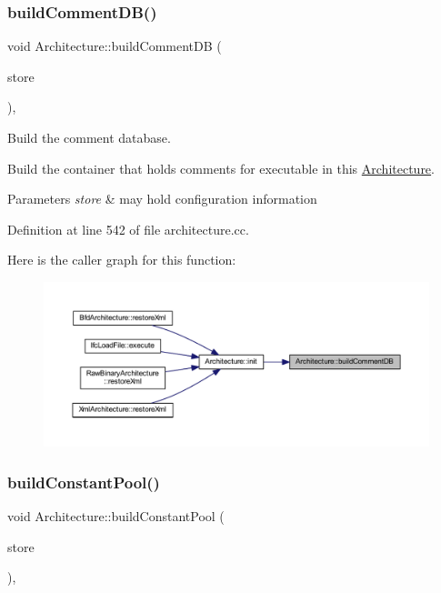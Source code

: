 \subsubsection{\texorpdfstring{buildCommentDB()}{buildCommentDB()}}
{\footnotesize\ttfamily void Architecture\+::build\+Comment\+DB (\begin{DoxyParamCaption}\item[{\mbox{\hyperlink{class_document_storage}{Document\+Storage}} \&}]{store }\end{DoxyParamCaption})\hspace{0.3cm}{\ttfamily [protected]}, {\ttfamily [virtual]}}



Build the comment database. 

Build the container that holds comments for executable in this \mbox{\hyperlink{class_architecture}{Architecture}}. 
\begin{DoxyParams}{Parameters}
{\em store} & may hold configuration information \\
\hline
\end{DoxyParams}


Definition at line 542 of file architecture.\+cc.

Here is the caller graph for this function\+:
\nopagebreak
\begin{figure}[H]
\begin{center}
\leavevmode
\includegraphics[width=350pt]{class_architecture_a517bf0e0ba766b241edf122422766249_icgraph}
\end{center}
\end{figure}
\mbox{\label{class_architecture_aed8aa1186293e453601bedb0db3d4ec1}} 
\subsubsection{\texorpdfstring{buildConstantPool()}{buildConstantPool()}}
{\footnotesize\ttfamily void Architecture\+::build\+Constant\+Pool (\begin{DoxyParamCaption}\item[{\mbox{\hyperlink{class_document_storage}{Document\+Storage}} \&}]{store }\end{DoxyParamCaption})\hspace{0.3cm}{\ttfamily [protected]}, {\ttfamily [virtual]}}



